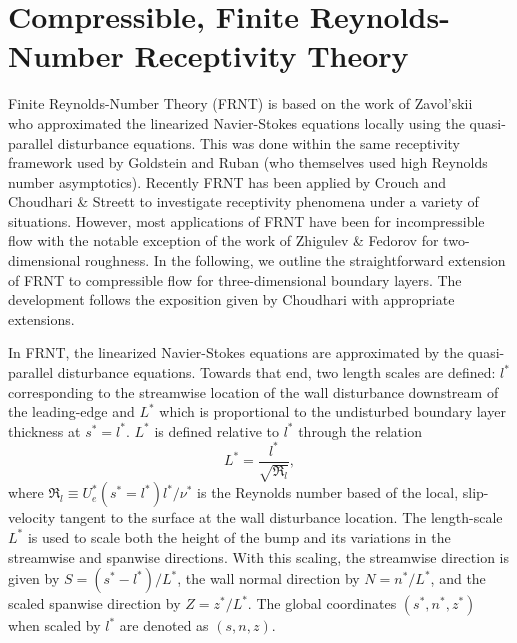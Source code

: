 %
%
%
%
%
\chapter[Finite Reynolds-Number Receptivity Theory]
{Compressible, Finite Reynolds-Number Receptivity Theory \label{a:FRNT}}

Finite Reynolds-Number Theory (FRNT) is based on the work of Zavol'skii \etal\
\cite{ZaReRy:83} who approximated the linearized Navier-Stokes equations
locally using the quasi-parallel disturbance equations.  This was done within
the same receptivity framework used by Goldstein \cite{Goldstein:85} and Ruban
\cite{Ruban:84} (who themselves used high Reynolds number asymptotics).
Recently FRNT has been applied by Crouch \cite{Crouch:92,Crouch:93} and
Choudhari \& Streett \cite{ChSt:92,ChSt:94} to investigate receptivity
phenomena under a variety of situations.  However, most applications of FRNT
have been for incompressible flow with the notable exception of the work of
Zhigulev \& Fedorov \cite{ZhFe:87} for two-dimensional roughness.  In the
following, we outline the straightforward extension of FRNT to compressible
flow for three-dimensional boundary layers. The development follows the
exposition given by Choudhari \cite{Choudhari:94} with appropriate extensions.

In FRNT, the linearized Navier-Stokes equations are approximated by the
quasi-parallel disturbance equations.  Towards that end, two length scales are
defined: $l^*$ corresponding to the streamwise location of the wall
disturbance downstream of the leading-edge and $L^*$ which is proportional to
the undisturbed boundary layer thickness at $s^* = l^*$.  $L^*$ is defined
relative to $l^*$ through the relation
%
\begin{equation}
  L^* = \frac{l^*}{\sqrt{\Re_l}} ,
\end{equation}
%
where $\Re_l \equiv U^*_e(s^* = l^*) l^* / \nu^*$ is the Reynolds number based
of the local, slip-velocity tangent to the surface at the wall disturbance
location.  The length-scale $L^*$ is used to scale both the height of the bump
and its variations in the streamwise and spanwise directions.  With this
scaling, the streamwise direction is given by $S = (s^* - l^*) / L^*$, the
wall normal direction by $N = n^* / L^*$, and the scaled spanwise direction by
$Z = z^*/L^*$.  The global coordinates $(s^*,n^*,z^*)$ when scaled by $l^*$
are denoted as $(s,n,z)$.


